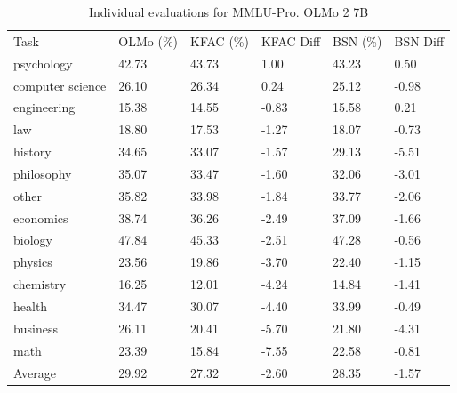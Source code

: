\documentclass{article} %
\begin{document}
\begin{table}[]
\begin{tabular}{llllll}
Task             & OLMo (\%) & KFAC (\%) & KFAC Diff & BSN (\%) & BSN Diff \\
psychology       & 42.73     & 43.73     & 1.00      & 43.23    & 0.50     \\
computer science & 26.10     & 26.34     & 0.24      & 25.12    & -0.98    \\
engineering      & 15.38     & 14.55     & -0.83     & 15.58    & 0.21     \\
law              & 18.80     & 17.53     & -1.27     & 18.07    & -0.73    \\
history          & 34.65     & 33.07     & -1.57     & 29.13    & -5.51    \\
philosophy       & 35.07     & 33.47     & -1.60     & 32.06    & -3.01    \\
other            & 35.82     & 33.98     & -1.84     & 33.77    & -2.06    \\
economics        & 38.74     & 36.26     & -2.49     & 37.09    & -1.66    \\
biology          & 47.84     & 45.33     & -2.51     & 47.28    & -0.56    \\
physics          & 23.56     & 19.86     & -3.70     & 22.40    & -1.15    \\
chemistry        & 16.25     & 12.01     & -4.24     & 14.84    & -1.41    \\
health           & 34.47     & 30.07     & -4.40     & 33.99    & -0.49    \\
business         & 26.11     & 20.41     & -5.70     & 21.80    & -4.31    \\
math             & 23.39     & 15.84     & -7.55     & 22.58    & -0.81    \\ \hline
Average          & 29.92     & 27.32     & -2.60     & 28.35    & -1.57   
\end{tabular}
\caption{Individual evaluations for MMLU-Pro. OLMo 2 7B}
\label{tab:mmlu_pro_individual}
\end{table}
\end{document}

